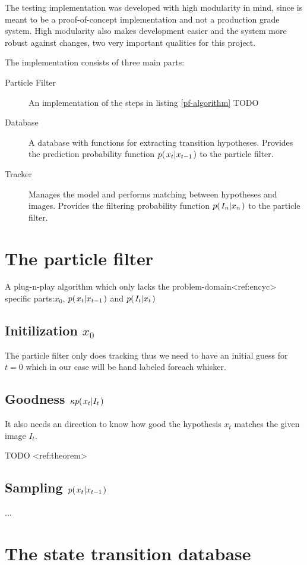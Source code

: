 The testing implementation was developed with high modularity in mind, since is meant to be a proof-of-concept implementation and not a production grade system. High modularity also makes development easier and the system more robust against changes, two very important qualities for this project.


The implementation consists of three main parts:
\begin{description}
  \item[Particle Filter] An implementation of the steps in listing \ref{pf-algorithm} TODO
  \item[Database] A database with functions for extracting transition hypotheses. Provides the prediction probability function $p{(\left. x_t \middle\vert x_{t-1} \right.)}$ to the particle filter.
  \item[Tracker] Manages the model and performs matching between hypotheses and images. Provides the filtering probability function $p{(\left. I_n \middle\vert x_n \right.)}$ to the particle filter.
\end{description}




\section{The particle filter}
    A plug-n-play algorithm which only lacks the problem-domain<ref:encyc> specific parts:$x_0$, $p{(\left. x_t \middle\vert x_{t-1} \right.)}$ and $p{(\left. I_t \middle\vert x_t \right.)}$
    \subsection{Initilization $x_0$}
        The particle filter only does tracking thus we need to have an initial guess for $t=0$ which in our case will be hand labeled foreach whisker.
    \subsection{Goodness $\kappa p{(\left. x_t \middle\vert I_t \right.)}$}
        It also needs an direction to know how good the hypothesis $x_t$ matches the given image $I_t$.

        TODO <ref:theorem>
    \subsection{Sampling $p{(\left. x_t \middle\vert x_{t-1} \right.)}$}

        ...

\section{The state transition database}

